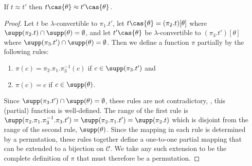 \begin{lemma}
\label{lem:approx-cas}
If $t \approx t'$ then $t\cas{\theta} \approx t'\cas{\theta}$.
\end{lemma}
\begin{proof}
Let $t$ be $\lambda$-convertible to $\pi_1.t'$, let $t\cas{\theta} =
(\pi_2.t)[\theta]$ where $\supp(\pi_2.t) \cap \supp(\theta) =
\emptyset$, and let $t'\cas{\theta}$ be $\lambda$-convertible to
$(\pi_3.t')[\theta]$ where $\supp(\pi_3.t')\cap \supp(\theta) =
\emptyset$. Then we define a function $\pi$ partially by the following
rules:
\begin{enumerate}
\item $\pi(c) = \pi_2.\pi_1.\pi_3^{-1}(c)$ if $c \in \supp(\pi_3.t')$ and
\item $\pi(c) = c$ if $c \in \supp(\theta)$.
\end{enumerate}
Since $\supp(\pi_3.t') \cap \supp(\theta) = \emptyset$, these rules
are not contradictory, \ie, this (partial) function is well-defined.
The range of the first rule is $\supp(\pi_2.\pi_1.\pi_3^{-1}.\pi_3.t')
= \supp(\pi_2.\pi_1.t') = \supp(\pi_2.t)$ which is disjoint from the
range of the second rule, $\supp(\theta)$. Since the mapping in each
rule is determined by a permutation, these rules together define a
one-to-one partial mapping that can be extended to a bijection on
$\mathcal{C}$. We take any such extension to be the complete
definition of $\pi$ that must therefore be a permutation.


\end{proof}
